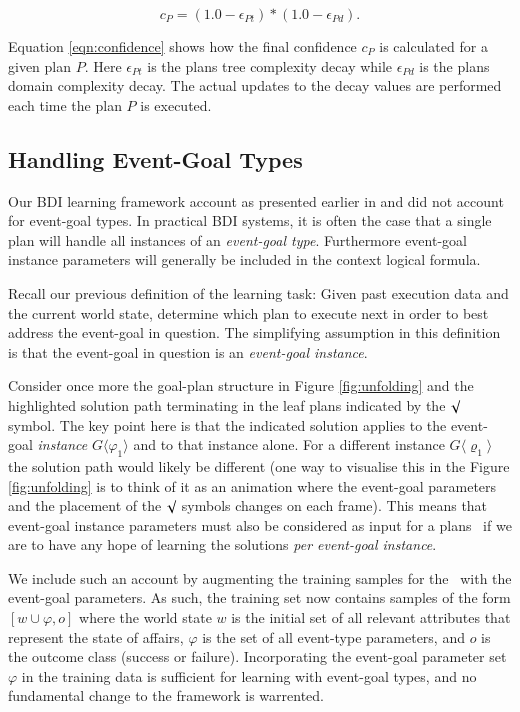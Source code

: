 \begin{equation*}\label{eqn:confidence}   
c_P = (1.0 - \epsilon_{Pt}) * (1.0 - \epsilon_{Pd}).
\end{equation*}

Equation \ref{eqn:confidence} shows how the final confidence $c_P$ is calculated for a given plan $P$. Here $\epsilon_{Pt}$ is the plans tree complexity decay while $\epsilon_{Pd}$ is the plans domain complexity decay. The actual updates to the decay values are performed each time the plan $P$ is executed. 

\subsection{Handling Event-Goal Types}

Our BDI learning framework account as presented earlier in \cite{Airiau:IJAT:09} and \cite{Singh:AAMAS10} did not account for event-goal types. In practical BDI systems, it is often the case that a single plan will handle all instances of an \textit{event-goal type}. Furthermore event-goal instance parameters will generally be included in the context logical formula. 

Recall our previous definition of the learning task: Given past execution data and the current world state, determine which plan to execute next in order to best address the event-goal in question. The simplifying assumption in this definition is that the event-goal in question is an \textit{event-goal instance}. 

Consider once more the goal-plan structure in Figure \ref{fig:unfolding} and the highlighted solution path terminating in the leaf plans indicated by the $\surd$ symbol. The key point here is that the indicated solution applies to the event-goal \textit{instance} $G\langle\varphi_1\rangle$ and to that instance alone. For a different instance $G\langle\varrho_1\rangle$ the solution path would likely be different (one way to visualise this in the Figure \ref{fig:unfolding} is to think of it as an animation where the event-goal parameters and the placement of the $\surd$ symbols changes on each frame).  This means that event-goal instance parameters must also be considered as input for a plans \dt\, if we are to have any hope of learning the solutions \textit{per event-goal instance}.

We include such an account by augmenting the training samples for the \dt\ with the event-goal parameters. As such, the training set now contains samples of the form $[w \cup \varphi,o]$ where the world state $w$ is the initial set of all relevant attributes that represent the state of affairs, $\varphi$ is the set of all event-type parameters, and $o$ is the outcome class (success or failure). Incorporating the event-goal parameter set $\varphi$ in the training data is sufficient for learning with event-goal types, and no fundamental change to the framework is warrented.


